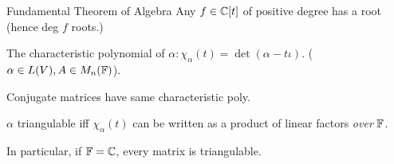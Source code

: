 \documentclass[a4paper]{article}
\begin{document}
\begin{thm} Fundamental Theorem of Algebra
	Any $ f \in \mathbb{C} [t] $ of positive degree has a root (hence deg $ f $ roots.)
\end{thm}

\begin{defi}
	The characteristic polynomial of $ \alpha: \chi_{\alpha}(t) = \det (\alpha - t \iota) $. ($ \alpha \in L(V), A \in M_{n}(\mathbb{F})  $).
	
	
\end{defi}
Conjugate matrices have same characteristic poly.

\begin{thm} 
	$ \alpha $ triangulable iff $ \chi_{\alpha}(t) $ can be written as a product of linear factors \emph{over} $ \mathbb{F} $.
	
	In particular, if $ \mathbb{F} = \mathbb{C} $, every matrix is triangulable.  
\end{thm}
\end{document}

